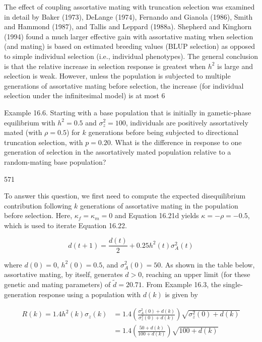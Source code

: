 \documentclass{article}
\begin{document}
The effect of coupling assortative mating with truncation selection was examined in detail by Baker (1973), DeLange (1974), Fernando and Gianola (1986), Smith and Hammond (1987), and Tallis and Leppard (1988a). Shepherd and Kinghorn (1994) found a much larger effective gain with assortative mating when selection (and mating) is based on estimated breeding values (BLUP selection) as opposed to simple individual selection (i.e., individual phenotypes). The general conclusion is that the relative increase in selection response is greatest when  $ h^{2} $ is large and selection is weak. However, unless the population is subjected to multiple generations of assortative mating before selection, the increase (for individual selection under the infinitesimal model) is at most 6%

Example 16.6. Starting with a base population that is initially in gametic-phase equilibrium with  $ h^2 = 0.5 $ and  $ \sigma_z^2 = 100 $, individuals are positively assortatively mated (with  $ \rho = 0.5 $) for  $ k $ generations before being subjected to directional truncation selection, with  $ p = 0.20 $. What is the difference in response to one generation of selection in the assortatively mated population relative to a random-mating base population?

571

To answer this question, we first need to compute the expected disequilibrium contribution following $k$ generations of assortative mating in the population before selection. Here, $\kappa_f = \kappa_m = 0$ and Equation 16.21d yields $\kappa = -\rho = -0.5$, which is used to iterate Equation 16.22.

\begin{equation}
d(t+1)=\frac{d(t)}{2}+0.25h^{2}(t)\sigma_{A}^{2}(t)
\tag{16.23a}
\label{eq:16_23a}
\end{equation}

where  $ d(0) = 0 $,  $ h^2(0) = 0.5 $, and  $ \sigma_A^2(0) = 50 $. As shown in the table below, assortative mating, by itself, generates  $ d > 0 $, reaching an upper limit (for these genetic and mating parameters) of  $ \widetilde{d} = 20.71 $. From Example 16.3, the single-generation response using a population with  $ d(k) $ is given by

\begin{equation}
\begin{aligned}R(k)=1.4h^{2}(k)\sigma_{z}(k)&=1.4\left(\frac{\sigma_{A}^{2}(0)+d(k)}{\sigma_{z}^{2}(0)+d(k)}\right)\sqrt{\sigma_{z}^{2}(0)+d(k)}\\&=1.4\left(\frac{50+d(k)}{100+d(k)}\right)\sqrt{100+d(k)}\\ \end{aligned}
\tag{16.23b}
\label{eq:16_23b}
\end{equation}
\end{document}
